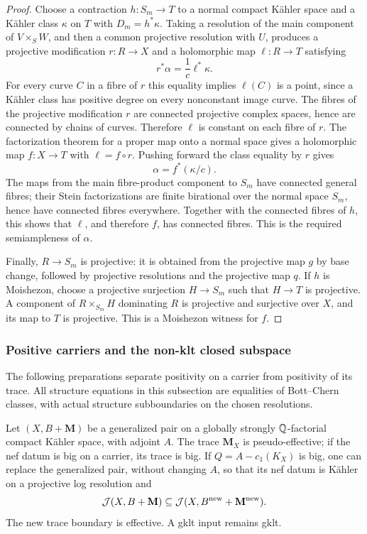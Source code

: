 \begin{proof}
Choose a contraction $h:S_m\to T$ to a normal compact K\"ahler space
and a K\"ahler class $\kappa$ on $T$ with $D_m=h^*\kappa$. Taking a
resolution of the main component of $V\times_S W$, and then a common
projective resolution with $U$, produces a projective modification
$r:R\to X$ and a holomorphic map $\ell:R\to T$ satisfying
\[
                         r^*\alpha=\frac1c\ell^*\kappa.
\]
For every curve $C$ in a fibre of $r$ this equality implies
$\ell(C)$ is a point, since a K\"ahler class has positive degree on
every nonconstant image curve. The fibres of the projective modification
$r$ are connected projective complex spaces, hence are connected by
chains of curves. Therefore $\ell$ is
constant on each fibre of $r$. The factorization theorem for a proper
map onto a normal space gives a holomorphic map $f:X\to T$ with
$\ell=f\circ r$. Pushing forward the class equality by $r$ gives
\[
                              \alpha=f^*(\kappa/c).
\]
The maps from the main fibre-product component to $S_m$ have connected
general fibres; their Stein factorizations are finite birational over
the normal space $S_m$, hence have connected fibres everywhere.
Together with the connected fibres of $h$, this shows that $\ell$,
and therefore $f$, has connected fibres. This is the required
semiampleness of $\alpha$.

Finally, $R\to S_m$ is projective: it is obtained from the projective
map $g$ by base change, followed by projective resolutions and the
projective map $q$. If $h$ is Moishezon, choose a projective surjection
$H\to S_m$ such that $H\to T$ is projective. A component of
$R\times_{S_m}H$ dominating $R$ is projective and surjective over $X$,
and its map to $T$ is projective. This is a Moishezon witness for $f$.
\end{proof}


\subsubsection{Positive carriers and the non-klt closed subspace}

The following preparations separate positivity on a carrier from
positivity of its trace. All structure equations in this subsection
are equalities of Bott--Chern classes, with actual structure
subboundaries on the chosen resolutions.

\begin{lemma}
\label{repair:lem:carrier-margin}
Let $(X,B+\mathbf M)$ be a generalized pair on a globally strongly
$\mathbb Q$-factorial compact K\"ahler space, with adjoint $A$.
The trace $\mathbf M_X$ is pseudo-effective; if the nef datum is
big on a carrier, its trace is big. If
$Q=A-c_1(K_X)$ is big, one can replace the generalized pair,
without changing $A$, so that its nef datum is K\"ahler on a
projective log resolution and
\[
 \mathcal J(X,B+\mathbf M)\subseteq
 \mathcal J(X,B^{\rm new}+\mathbf M^{\rm new}).
\]
The new trace boundary is effective. A gklt input remains gklt.
\end{lemma}

